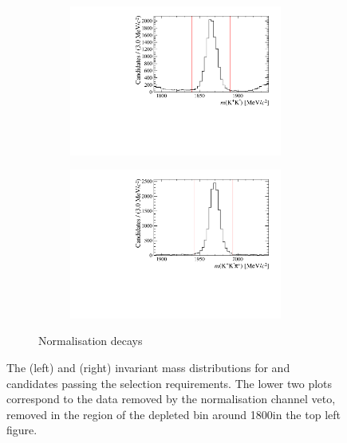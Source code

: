 \begin{figure}[!h]
   \begin{subfigure}[t]{1.0\textwidth}
      \centering
      \begin{subfigure}[t]{0.40\textwidth}
         \centering
         \includegraphics[width=1.0\textwidth]{figs/Selection/Phimass_KKPi_B2DsD0.pdf}
      \end{subfigure}
      \begin{subfigure}[t]{0.40\textwidth}
         \centering
         \includegraphics[width=1.0\textwidth]{figs/Selection/Dmass_KKPi_B2DsD0.pdf}
      \end{subfigure}
      \caption{Normalisation \decay{\Bp}{\Dsp\Dzb} decays}
   \end{subfigure}
   \caption{The \Kp\Km (left) and \Dsp (right) invariant mass distributions for \decay{\Bp}{\Dsp\Kp\Km} and \decay{\Bp}{\Dsp\Dzb} candidates passing the selection requirements. The lower two plots correspond to the data removed by the normalisation channel veto, removed in the region of the depleted bin around 1800\mevcc in the top left figure.}
   \label{fig:d_KK_mass}   
\end{figure}

